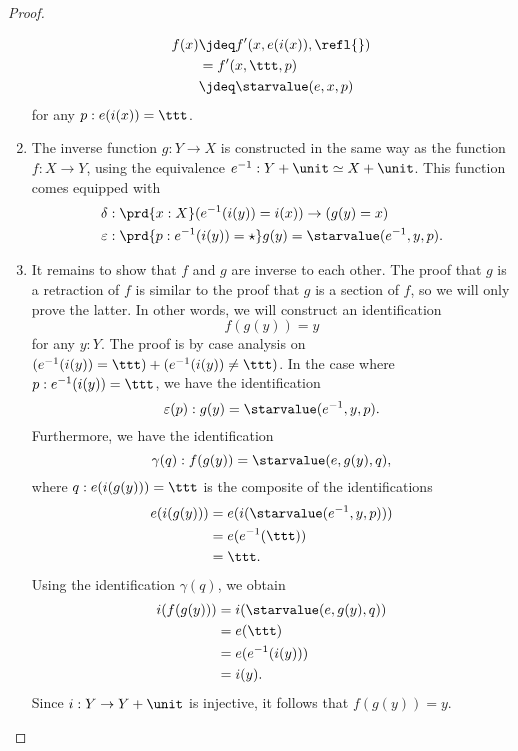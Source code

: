 \begin{proof}
\begin{enumerate}
    \begin{align*}
      f(x) & \jdeq f'(x,e(i(x)),\refl{}) \\
           & = f'(x,\ttt,p) \\
           & \jdeq \starvalue(e,x,p)
    \end{align*}
    for any $p:e(i(x))=\ttt$. 
  \item The inverse function $g:Y\to X$ is constructed in the same way as the function $f:X\to Y$, using the equivalence $e^{-1}:Y+\unit\simeq X+\unit$. This function comes equipped with
    \begin{align*}
      \delta & : \prd{x:X}(e^{-1}(i(y))=i(x))\to (g(y)=x) \\
      \varepsilon & : \prd{p:e^{-1}(i(y))=\star}g(y)=\starvalue(e^{-1},y,p). 
    \end{align*}
  \item It remains to show that $f$ and $g$ are inverse to each other. The proof that $g$ is a retraction of $f$ is similar to the proof that $g$ is a section of $f$, so we will only prove the latter. In other words, we will construct an identification
    \begin{equation*}
      f(g(y))=y
    \end{equation*}
    for any $y:Y$. The proof is by case analysis on $(e^{-1}(i(y))=\ttt)+(e^{-1}(i(y))\neq \ttt)$. In the case where $p:e^{-1}(i(y))=\ttt$, we have the identification
    \begin{equation*}
      \varepsilon(p):g(y)=\starvalue(e^{-1},y,p).
    \end{equation*}
    Furthermore, we have the identification
    \begin{equation*}
      \gamma(q) : f(g(y)) = \starvalue(e,g(y),q),
    \end{equation*}
    where $q:e(i(g(y)))=\ttt$ is the composite of the identifications
    \begin{align*}
      e(i(g(y))) & = e(i(\starvalue(e^{-1},y,p))) \\
                 & = e(e^{-1}(\ttt)) \\
      & =\ttt.
    \end{align*}
    Using the identification $\gamma(q)$, we obtain
    \begin{align*}
      i(f(g(y))) & = i(\starvalue(e,g(y),q)) \\
                 & = e(\ttt) \\
                 & = e(e^{-1}(i(y))) \\
                 & = i(y).
    \end{align*}
    Since $i:Y\to Y+\unit$ is injective, it follows that $f(g(y))=y$. 
    \qedhere
  \end{enumerate}
\end{proof}

